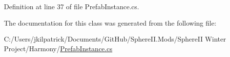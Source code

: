 Definition at line 37 of file Prefab\+Instance.\+cs.



The documentation for this class was generated from the following file\+:\begin{DoxyCompactItemize}
\item 
C\+:/\+Users/jkilpatrick/\+Documents/\+Git\+Hub/\+Sphere\+I\+I.\+Mods/\+Sphere\+I\+I Winter Project/\+Harmony/\mbox{\hyperlink{_prefab_instance_8cs}{Prefab\+Instance.\+cs}}\end{DoxyCompactItemize}
